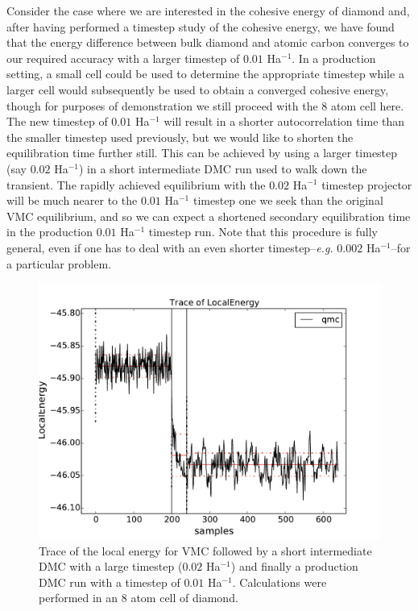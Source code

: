 Consider the case where we are interested in the cohesive energy of 
diamond and, after having performed a timestep study of the cohesive 
energy, we have found that the energy difference between bulk diamond 
and atomic carbon converges to our required accuracy with a larger 
timestep of $0.01$ Ha$^{-1}$.  In a production setting, a small cell 
could be used to determine  the appropriate timestep while a larger 
cell would subsequently be used to obtain a converged cohesive energy, 
though for purposes of demonstration we still proceed with the 8 atom 
cell here.  The new timestep of $0.01$ Ha$^{-1}$ will result in a shorter 
autocorrelation time than the smaller timestep used previously, but 
we would like to shorten the equilibration time further still.  This 
can be achieved by using a larger timestep (say $0.02$ Ha$^{-1}$) in a 
short intermediate DMC run used to walk down the transient.  The 
rapidly achieved equilibrium with the $0.02$ Ha$^{-1}$ timestep 
projector will be much nearer to the $0.01$ Ha$^{-1}$ timestep one 
we seek than the original VMC equilibrium, and so we can expect 
a shortened secondary equilibration time in the production 
$0.01$ Ha$^{-1}$ timestep run. Note that this procedure is fully 
general, even if one has to deal with an even shorter 
timestep--\emph{e.g.} $0.002$ Ha$^{-1}$--for a particular problem.

\begin{figure}
\begin{center}
\includegraphics[trim = 0mm 0mm 0mm 0mm, clip,width=0.75\columnwidth]{figures/qmca_accel_dmc.pdf}
\end{center}
\caption{Trace of the local energy for VMC followed by a short intermediate DMC with a large timestep ($0.02$ Ha$^{-1}$) and finally a production DMC run with a timestep of $0.01$ Ha$^{-1}$.  Calculations were performed in an 8 atom cell of diamond.  
\label{fig:qmca_accel_dmc}
}
\end{figure}

